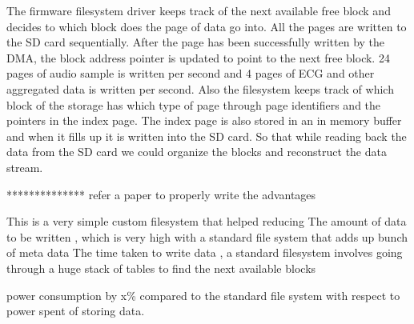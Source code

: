 The firmware filesystem driver keeps track of the next available free block and decides to which block does the page of data go into. All the pages are written to the SD card sequentially. After the page has been successfully written by the DMA, the block address pointer is updated to point to the next free block.  24 pages of audio sample is written per second and 4 pages of ECG and other aggregated data is written per second.  
Also the filesystem keeps track of which block of the storage has which type of page through page identifiers and the pointers in the index page. The index page is also stored in an in memory buffer and when it fills up it is written into the SD card. So that while reading back the data from the SD card we could organize the blocks and reconstruct the data stream.  

**************
refer a paper to properly write the advantages 


This is a very simple custom filesystem that helped reducing  
The amount of data to be written , which is very high with a standard file system that adds up bunch of meta data 
The time taken to write data , a standard filesystem involves going through a huge stack of tables to find the next available blocks  

power consumption by x\%  compared to the standard file system with respect to power spent of storing data. 